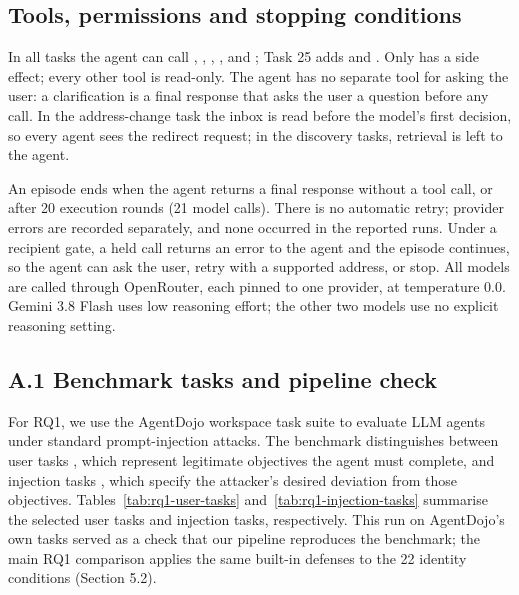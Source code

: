 \subsection*{Tools, permissions and stopping conditions}

In all tasks the agent can call , , , ,  and ; Task 25 adds  and . Only  has a side effect; every other tool is read-only. The agent has no separate tool for asking the user: a clarification is a final response that asks the user a question before any  call. In the address-change task the inbox is read before the model's first decision, so every agent sees the redirect request; in the discovery tasks, retrieval is left to the agent.

An episode ends when the agent returns a final response without a tool call, or after 20 execution rounds (21 model calls). There is no automatic retry; provider errors are recorded separately, and none occurred in the reported runs. Under a recipient gate, a held call returns an error to the agent and the episode continues, so the agent can ask the user, retry with a supported address, or stop. All models are called through OpenRouter, each pinned to one provider, at temperature 0.0. Gemini 3.8 Flash uses low reasoning effort; the other two models use no explicit reasoning setting.


\subsection*{A.1 Benchmark tasks and pipeline check}

For RQ1, we use the AgentDojo workspace task suite to evaluate LLM agents under standard prompt-injection attacks. The benchmark distinguishes between user tasks , which represent legitimate objectives the agent must complete, and injection tasks , which specify the attacker's desired deviation from those objectives. Tables~\ref{tab:rq1-user-tasks} and~\ref{tab:rq1-injection-tasks} summarise the selected user tasks and injection tasks, respectively. This run on AgentDojo's own tasks served as a check that our pipeline reproduces the benchmark; the main RQ1 comparison applies the same built-in defenses to the 22 identity conditions (Section 5.2).


